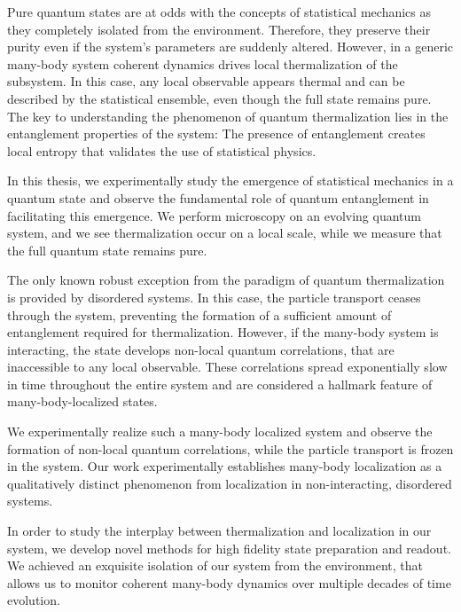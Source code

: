 
Pure quantum states are at odds with the concepts of statistical mechanics as they completely isolated from the environment. Therefore, they preserve their purity even if the system's parameters are suddenly altered. However, in a generic many-body system coherent dynamics drives local thermalization of the subsystem. In this case, any local observable appears thermal and can be described by the statistical ensemble, even though the full state remains pure. The key to understanding the phenomenon of quantum thermalization lies in the entanglement properties of the system: The presence of entanglement creates local entropy that validates the use of statistical physics.

In this thesis, we experimentally study the emergence of statistical mechanics in a quantum state and observe the fundamental role of quantum entanglement in facilitating this emergence. We perform microscopy on an evolving quantum system, and we see thermalization occur on a local scale, while we measure that the full quantum state remains pure.

The only known robust exception from the paradigm of quantum thermalization is provided by disordered systems. In this case, the particle transport ceases through the system, preventing the formation of a sufficient amount of entanglement required for thermalization. However, if the many-body system is interacting, the state develops non-local quantum correlations, that are inaccessible to any local observable. These correlations spread exponentially slow in time throughout the entire system and are considered a hallmark feature of many-body-localized states.

We experimentally realize such a many-body localized system and observe the formation of non-local quantum correlations, while the particle transport is frozen in the system. Our work experimentally establishes many-body localization as a qualitatively distinct phenomenon from localization in non-interacting, disordered systems.

In order to study the interplay between thermalization and localization in our system, we develop novel methods for high fidelity state preparation and readout. We achieved an exquisite isolation of our system from the environment, that allows us to monitor coherent many-body dynamics over multiple decades of time evolution.